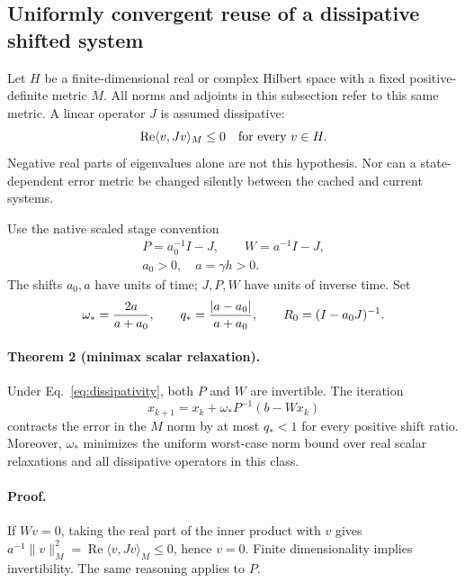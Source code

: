 \subsection{Uniformly convergent reuse of a dissipative shifted system}
\label{subsec:cayley-theorem}

Let $H$ be a finite-dimensional real or complex Hilbert space with a fixed
positive-definite metric $M$.  All norms and adjoints in this subsection refer
to this same metric.  A linear operator $J$ is assumed dissipative:
\begin{equation}
 \operatorname{Re}\langle v,Jv\rangle_M\leq0
 \quad\hbox{for every }v\in H.
 \label{eq:dissipativity}
\end{equation}
Negative real parts of eigenvalues alone are not this hypothesis.  Nor can a
state-dependent error metric be changed silently between the cached and
current systems.

Use the native scaled stage convention
\begin{equation}
 \begin{gathered}
 P=a_0^{-1}I-J,\qquad W=a^{-1}I-J,\\
 a_0>0,\quad a=\gamma h>0.
 \end{gathered}
 \label{eq:native-shifts}
\end{equation}
The shifts $a_0,a$ have units of time; $J,P,W$ have units of inverse time.
Set
\begin{equation}
 \omega_*={2a\over a+a_0},\qquad
 q_*={|a-a_0|\over a+a_0},\qquad
 R_0=(I-a_0J)^{-1}.
 \label{eq:optimal-relaxation}
\end{equation}

\paragraph{Theorem 2 (minimax scalar relaxation).}
Under Eq.~\eqref{eq:dissipativity}, both $P$ and $W$ are invertible.  The
iteration
\begin{equation}
 x_{k+1}=x_k+\omega_*P^{-1}(b-Wx_k)
 \label{eq:relaxed-richardson}
\end{equation}
contracts the error in the $M$ norm by at most $q_*<1$ for every positive shift
ratio.  Moreover, $\omega_*$ minimizes the uniform worst-case norm bound over
real scalar relaxations and all dissipative operators in this class.

\paragraph{Proof.}
If $Wv=0$, taking the real part of the inner product with $v$ gives
$a^{-1}\|v\|_M^2=\operatorname{Re}\langle v,Jv\rangle_M\leq0$, hence $v=0$.
Finite dimensionality implies invertibility.  The same reasoning applies to
$P$.

